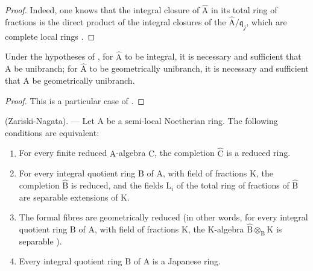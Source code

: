 \begin{proof}
  Indeed, one knows that the integral closure of $\widehat{\mathrm{A}}$ in its total ring of fractions is the direct product of the integral closures of the $\widehat{\mathrm{A}}/\mathfrak{q}_j$, which are complete local rings .
\end{proof}

\begin{corollary}[7.6.3]
\label{IV.7.6.3}
Under the hypotheses of , for $\widehat{\mathrm{A}}$ to be integral, it is necessary and sufficient that $\mathrm{A}$ be unibranch; for $\widehat{\mathrm{A}}$ to be geometrically unibranch, it is necessary and sufficient that $\mathrm{A}$ be geometrically unibranch.
\end{corollary}

\begin{proof}
This is a particular case of .
\end{proof}

\begin{theorem}[7.6.4]
\label{IV.7.6.4}
(Zariski-Nagata). --- Let $\mathrm{A}$ be a semi-local Noetherian ring. The following conditions are equivalent:
\begin{enumerate}[label=\emph{\alph*)}]
  \item For every finite reduced $\mathrm{A}$-algebra $\mathrm{C}$, the completion $\widehat{\mathrm{C}}$ is a reduced ring.
  \item[\rm a$'$)] For every integral quotient ring $\mathrm{B}$ of $\mathrm{A}$, with field of fractions $\mathrm{K}$, the completion $\widehat{\mathrm{B}}$ is reduced, and the fields $\mathrm{L}_i$ of the total ring of fractions of $\widehat{\mathrm{B}}$ are separable extensions of $\mathrm{K}$.
  \item[\rm a$''$)] The formal fibres are geometrically reduced (in other words, for every integral quotient ring $\mathrm{B}$ of $\mathrm{A}$, with field of fractions $\mathrm{K}$, the $\mathrm{K}$-algebra $\widehat{\mathrm{B}}\otimes_\mathrm{B}\mathrm{K}$ is separable ).
  \item Every integral quotient ring $\mathrm{B}$ of $\mathrm{A}$ is a Japanese ring.
\end{enumerate}
\end{theorem}

